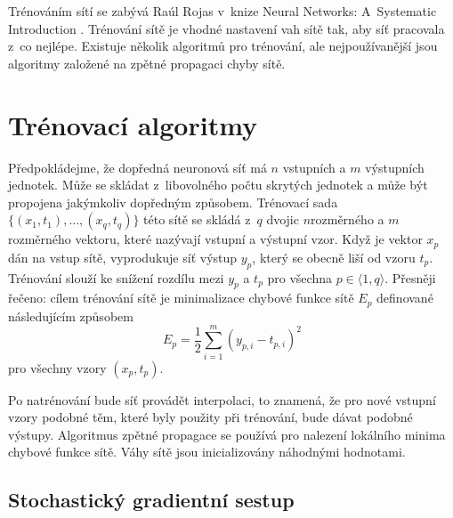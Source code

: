 Trénováním sítí se zabývá Raúl Rojas v~knize Neural Networks: A~Systematic Introduction \cite{Rojas1996}.
Trénování sítě je vhodné nastavení vah sítě tak, aby síť pracovala z~co nejlépe.
Existuje několik algoritmů pro trénování, ale nejpoužívanější jsou algoritmy založené na zpětné propagaci chyby sítě.

\section{Trénovací algoritmy}
\label{sec:train}

Předpokládejme, že dopředná neuronová síť má $n$ vstupních a $m$ výstupních jednotek.
Může se skládat z~libovolného počtu skrytých jednotek a může být propojena jakýmkoliv dopředným způsobem.
Trénovací sada $\{(x_1,t_1),..., (x_q,t_q)\}$ této sítě se skládá z~$q$ dvojic $n$rozměrného a $m$rozměrného vektoru, které nazývají vstupní a výstupní vzor.
Když je vektor $x_p$ dán na vstup sítě, vyprodukuje síť výstup $y_p$, který se obecně liší od vzoru $t_p$.
Trénování slouží ke snížení rozdílu mezi $y_p$ a $t_p$ pro všechna $p \in \langle 1,q \rangle$.
Přesněji řečeno: cílem trénování sítě je minimalizace chybové funkce sítě $E_p$ definované následujícím způsobem \begin{equation}E_p=\frac{1}{2}\sum^{m}_{i=1}{(y_{p,i}-t_{p,i})^2}\label{eq:err}\end{equation} pro všechny vzory $(x_p,t_p)$.

Po natrénování bude síť provádět interpolaci, to znamená, že pro nové vstupní vzory podobné těm, které byly použity při trénování, bude dávat podobné výstupy.
Algoritmus zpětné propagace se používá pro nalezení lokálního minima chybové funkce sítě.
Váhy sítě jsou inicializovány náhodnými hodnotami.

\subsection{Stochastický gradientní sestup}
\label{sub:sgd}

